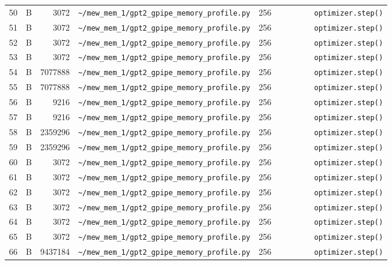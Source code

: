 \documentclass{article}
\begin{document}
\begin{longtable}{r l r p{6.5cm} r p{7.0cm}}
50 & B & 3072 & \lstinline|~/mew_mem_1/gpt2_gpipe_memory_profile.py| & 256 & \lstinline|        optimizer.step()| \\
51 & B & 3072 & \lstinline|~/mew_mem_1/gpt2_gpipe_memory_profile.py| & 256 & \lstinline|        optimizer.step()| \\
52 & B & 3072 & \lstinline|~/mew_mem_1/gpt2_gpipe_memory_profile.py| & 256 & \lstinline|        optimizer.step()| \\
53 & B & 3072 & \lstinline|~/mew_mem_1/gpt2_gpipe_memory_profile.py| & 256 & \lstinline|        optimizer.step()| \\
54 & B & 7077888 & \lstinline|~/mew_mem_1/gpt2_gpipe_memory_profile.py| & 256 & \lstinline|        optimizer.step()| \\
55 & B & 7077888 & \lstinline|~/mew_mem_1/gpt2_gpipe_memory_profile.py| & 256 & \lstinline|        optimizer.step()| \\
56 & B & 9216 & \lstinline|~/mew_mem_1/gpt2_gpipe_memory_profile.py| & 256 & \lstinline|        optimizer.step()| \\
57 & B & 9216 & \lstinline|~/mew_mem_1/gpt2_gpipe_memory_profile.py| & 256 & \lstinline|        optimizer.step()| \\
58 & B & 2359296 & \lstinline|~/mew_mem_1/gpt2_gpipe_memory_profile.py| & 256 & \lstinline|        optimizer.step()| \\
59 & B & 2359296 & \lstinline|~/mew_mem_1/gpt2_gpipe_memory_profile.py| & 256 & \lstinline|        optimizer.step()| \\
60 & B & 3072 & \lstinline|~/mew_mem_1/gpt2_gpipe_memory_profile.py| & 256 & \lstinline|        optimizer.step()| \\
61 & B & 3072 & \lstinline|~/mew_mem_1/gpt2_gpipe_memory_profile.py| & 256 & \lstinline|        optimizer.step()| \\
62 & B & 3072 & \lstinline|~/mew_mem_1/gpt2_gpipe_memory_profile.py| & 256 & \lstinline|        optimizer.step()| \\
63 & B & 3072 & \lstinline|~/mew_mem_1/gpt2_gpipe_memory_profile.py| & 256 & \lstinline|        optimizer.step()| \\
64 & B & 3072 & \lstinline|~/mew_mem_1/gpt2_gpipe_memory_profile.py| & 256 & \lstinline|        optimizer.step()| \\
65 & B & 3072 & \lstinline|~/mew_mem_1/gpt2_gpipe_memory_profile.py| & 256 & \lstinline|        optimizer.step()| \\
66 & B & 9437184 & \lstinline|~/mew_mem_1/gpt2_gpipe_memory_profile.py| & 256 & \lstinline|        optimizer.step()| \\

\end{longtable}
\end{document}
